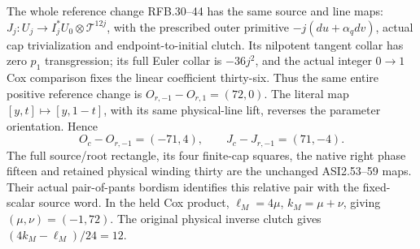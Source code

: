 The whole reference change RFB.30--44 has the same source and line maps:
\(J_j:U_j\to I_j^*U_0\otimes\mathcal T^{12j}\), with the prescribed
outer primitive \(-j(du+\alpha_qdv)\), actual cap trivialization and
endpoint-to-initial clutch.  Its nilpotent tangent collar has zero
\(p_1\) transgression; its full Euler collar is \(-36j^2\), and the
actual integer \(0\to1\) Cox comparison fixes the linear coefficient
thirty-six.  Thus the same entire positive reference change is
\(O_{r,-1}-O_{r,1}=(72,0)\).  The literal map
\([y,t]\mapsto[y,1-t]\), with its same physical-line lift, reverses
the parameter orientation.  Hence
\[
 O_c-O_{r,-1}=(-71,4),\qquad J_c-J_{r,-1}=(71,-4).
\]
The full source/root rectangle, its four finite-cap squares, the native
right phase fifteen and retained physical winding thirty are the
unchanged ASI2.53--59 maps.  Their actual pair-of-pants bordism identifies
this relative pair with the fixed-scalar source word.  In the held Cox
product, \(\ell_M=4\mu\), \(k_M=\mu+\nu\), giving
\((\mu,\nu)=(-1,72)\).  The original physical inverse clutch gives
\((4k_M-\ell_M)/24=12\).

